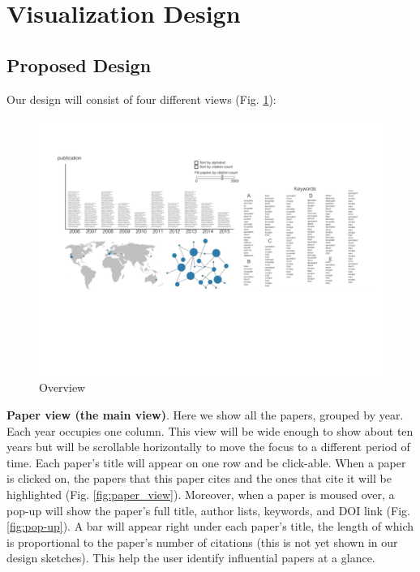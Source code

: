 \documentclass[dvips,12pt]{article}
\begin{document}
\section{Visualization Design}
\subsection{Proposed Design}
Our design will consist of four different views (Fig. \ref*{fig:overview}):

\begin{figure}[htb!]
    \centering
    \includegraphics[width=160mm]{visproposalDrawing_page_Part_1.pdf}
    \caption{Overview}
    \label{fig:overview}
\end{figure}

\textbf{Paper view (the main view)}. Here we show all the papers, grouped by year. Each year occupies one column. This view will be wide enough to show about ten years but will be scrollable horizontally to move the focus to a different period of time. Each paper's title will appear on one row and be click-able. When a paper is clicked on, the papers that this paper cites and the ones that cite it will be highlighted (Fig. \ref{fig:paper_view}). Moreover, when a paper is moused over, a pop-up will show the paper's full title, author lists, keywords, and DOI link (Fig. \ref{fig:pop-up}). A bar will appear right under each paper's title, the length of which is proportional to the paper's number of citations (this is not yet shown in our design sketches). This help the user identify influential papers at a glance.
\end{document}
